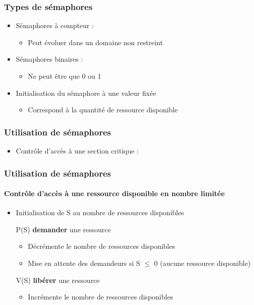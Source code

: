 \begin{frame}
\frametitle{Types de sémaphores}
\begin{itemize}
\item Sémaphores à compteur :
\begin{itemize}
\item Peut évoluer dans un domaine non restreint
\end{itemize}
\item Sémaphores binaires :
\begin{itemize}
\item Ne peut être que 0 ou 1
\end{itemize}
\item Initialisation du sémaphore à une valeur fixée
\begin{itemize}
\item Correspond à la quantité de ressource disponible
\end{itemize}
\end{itemize}
\end{frame}

\begin{frame}
\frametitle{Utilisation de sémaphores}
\begin{itemize}
\item Contrôle d’accès à une section critique :

\end{itemize}
\end{frame}

\begin{frame}
\frametitle{Utilisation de sémaphores}
\framesubtitle{Contrôle d’accès à une ressource disponible en nombre limitée}
\begin{itemize}
\item Initialisation de S au nombre de ressources disponibles
\item [P(S)] \textbf{demander} une ressource
\begin{itemize}
\item Décrémente le nombre de ressources disponibles
\item Mise en attente des demandeurs si S $\leqslant$ 0 (aucune ressource disponible)
\end{itemize}
\item [V(S)] \textbf{libérer} une ressource
\begin{itemize}
\item Incrémente le nombre de ressources disponibles
\end{itemize}
\end{itemize}
\end{frame}

